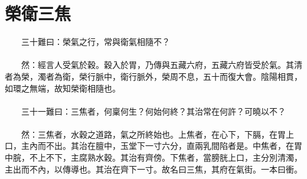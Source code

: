 \section{榮衛三焦}

　　三十難曰：榮氣之行，常與衛氣相隨不？
\\\\
　　然：經言人受氣於穀。穀入於胃，乃傳與五藏六府，五藏六府皆受於氣。其清者為榮，濁者為衛，榮行脈中，衛行脈外，榮周不息，五十而復大會。陰陽相貫，如環之無端，故知榮衛相隨也。
\\\\
　　三十一難曰：三焦者，何稟何生？何始何終？其治常在何許？可曉以不？
\\\\
　　然：三焦者，水穀之道路，氣之所終始也。上焦者，在心下，下膈，在胃上口，主內而不出。其治在膻中，玉堂下一寸六分，直兩乳間陷者是。中焦者，在胃中脘，不上不下，主腐熟水穀。其治有齊傍。下焦者，當膀胱上口，主分別清濁，主出而不內，以傳導也。其治在齊下一寸。故名曰三焦，其府在氣街。一本曰衝。
